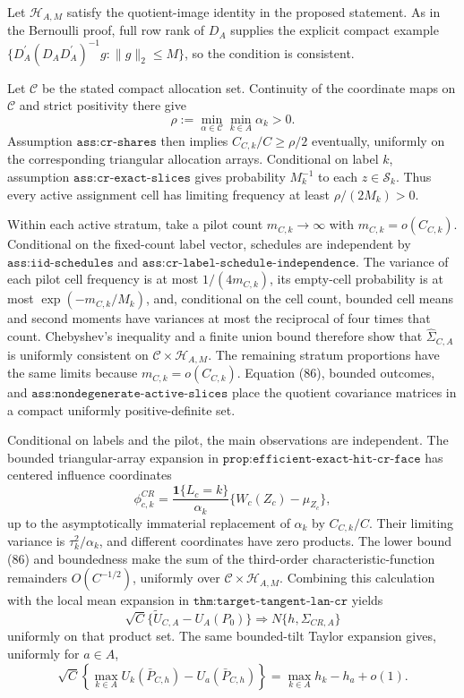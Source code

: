 Let \(\mathscr H_{A,M}\) satisfy the quotient-image identity in the proposed statement.  As in the Bernoulli proof, full row rank of \(D_A\) supplies the explicit compact example \(\{D_A^{\prime}(D_AD_A^{\prime})^{-1}g:\lVert g\rVert_2\leq M\}\), so the condition is consistent.

Let \(\mathcal C\) be the stated compact allocation set.  Continuity of the coordinate maps on \(\mathcal C\) and strict positivity there give
\[
\rho:=\min_{\alpha\in\mathcal C}\min_{k\in A}\alpha_k>0.          \tag{86}
\]
Assumption \(\texttt{ass:cr-shares}\) then implies \(C_{C,k}/C\geq\rho/2\) eventually, uniformly on the corresponding triangular allocation arrays.  Conditional on label \(k\), assumption \(\texttt{ass:cr-exact-slices}\) gives probability \(M_k^{-1}\) to each \(z\in\mathcal S_k\).  Thus every active assignment cell has limiting frequency at least \(\rho/(2M_k)>0\).

Within each active stratum, take a pilot count \(m_{C,k}\to\infty\) with \(m_{C,k}=o(C_{C,k})\).  Conditional on the fixed-count label vector, schedules are independent by \(\texttt{ass:iid-schedules}\) and \(\texttt{ass:cr-label-schedule-independence}\).  The variance of each pilot cell frequency is at most \(1/(4m_{C,k})\), its empty-cell probability is at most \(\exp(-m_{C,k}/M_k)\), and, conditional on the cell count, bounded cell means and second moments have variances at most the reciprocal of four times that count.  Chebyshev's inequality and a finite union bound therefore show that \(\widehat\Sigma_{C,A}\) is uniformly consistent on \(\mathcal C\times\mathscr H_{A,M}\).  The remaining stratum proportions have the same limits because \(m_{C,k}=o(C_{C,k})\).  Equation (86), bounded outcomes, and \(\texttt{ass:nondegenerate-active-slices}\) place the quotient covariance matrices in a compact uniformly positive-definite set.

Conditional on labels and the pilot, the main observations are independent.  The bounded triangular-array expansion in \(\texttt{prop:efficient-exact-hit-cr-face}\) has centered influence coordinates
\[
\phi_{c,k}^{CR}
=\frac{\mathbf1\{L_c=k\}}{\alpha_k}\{W_c(Z_c)-\mu_{Z_c}\},
\]
up to the asymptotically immaterial replacement of \(\alpha_k\) by \(C_{C,k}/C\).  Their limiting variance is \(\tau_k^2/\alpha_k\), and different coordinates have zero products.  The lower bound (86) and boundedness make the sum of the third-order characteristic-function remainders \(O(C^{-1/2})\), uniformly over \(\mathcal C\times\mathscr H_{A,M}\).  Combining this calculation with the local mean expansion in \(\texttt{thm:target-tangent-lan-cr}\) yields
\[
\sqrt C\{\widetilde U_{C,A}-U_A(P_0)\}
\Rightarrow N\{h,\Sigma_{CR,A}\}                                \tag{87}
\]
uniformly on that product set.  The same bounded-tilt Taylor expansion gives, uniformly for \(a\in A\),
\[
\sqrt C\!\left\{\max_{k\in A}U_k(\bar P_{C,h})
-U_a(\bar P_{C,h})\right\}
=\max_{k\in A}h_k-h_a+o(1).                                     \tag{88}
\]

